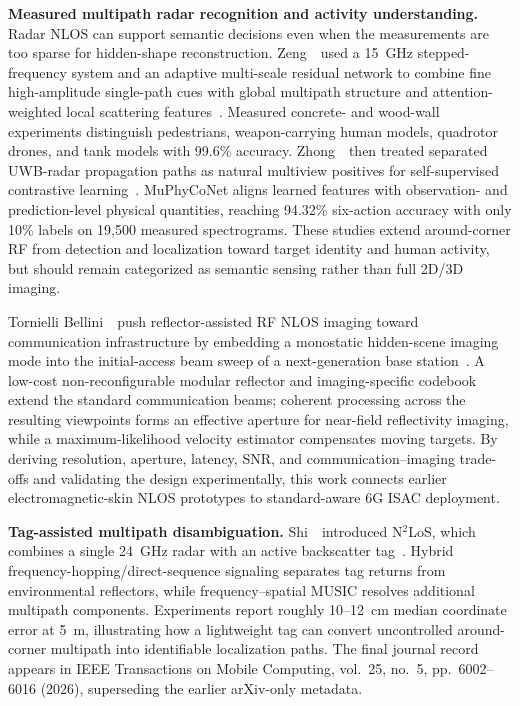 \vspace{0.8mm}
\noindent \textbf{Measured multipath radar recognition and activity understanding.}
Radar NLOS can support semantic decisions even when the measurements are too sparse for hidden-shape reconstruction. Zeng~\etal~used a 15~GHz stepped-frequency system and an adaptive multi-scale residual network to combine fine high-amplitude single-path cues with global multipath structure and attention-weighted local scattering features~\cite{zengMultipathFeatureFusionNLOS2026}. Measured concrete- and wood-wall experiments distinguish pedestrians, weapon-carrying human models, quadrotor drones, and tank models with 99.6\% accuracy. Zhong~\etal~then treated separated UWB-radar propagation paths as natural multiview positives for self-supervised contrastive learning~\cite{zhongMultipathContrastiveNLOS2026}. MuPhyCoNet aligns learned features with observation- and prediction-level physical quantities, reaching 94.32\% six-action accuracy with only 10\% labels on 19,500 measured spectrograms. These studies extend around-corner RF from detection and localization toward target identity and human activity, but should remain categorized as semantic sensing rather than full 2D/3D imaging.

Tornielli Bellini~\etal~push reflector-assisted RF NLOS imaging toward communication infrastructure by embedding a monostatic hidden-scene imaging mode into the initial-access beam sweep of a next-generation base station~\cite{tornielliInitialAccessNLOS2025}. A low-cost non-reconfigurable modular reflector and imaging-specific codebook extend the standard communication beams; coherent processing across the resulting viewpoints forms an effective aperture for near-field reflectivity imaging, while a maximum-likelihood velocity estimator compensates moving targets. By deriving resolution, aperture, latency, SNR, and communication--imaging trade-offs and validating the design experimentally, this work connects earlier electromagnetic-skin NLOS prototypes to standard-aware 6G ISAC deployment.


\vspace{0.8mm}
\noindent \textbf{Tag-assisted multipath disambiguation.}
Shi~\etal~introduced N$^2$LoS, which combines a single 24~GHz radar with an active backscatter tag~\cite{shiN2LoS2025}. Hybrid frequency-hopping/direct-sequence signaling separates tag returns from environmental reflectors, while frequency--spatial MUSIC resolves additional multipath components. Experiments report roughly 10--12~cm median coordinate error at 5~m, illustrating how a lightweight tag can convert uncontrolled around-corner multipath into identifiable localization paths. The final journal record appears in IEEE Transactions on Mobile Computing, vol.~25, no.~5, pp.~6002--6016 (2026), superseding the earlier arXiv-only metadata.

